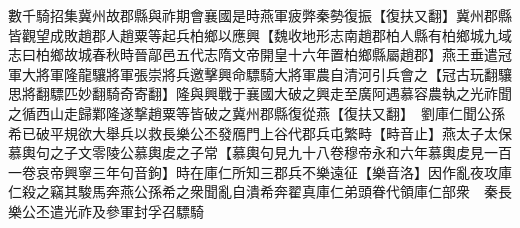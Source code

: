 數千騎招集冀州故郡縣與祚期會襄國是時燕軍疲弊秦勢復振【復扶又翻】冀州郡縣皆觀望成敗趙郡人趙粟等起兵柏鄉以應興【魏收地形志南趙郡柏人縣有柏鄉城九域志曰柏鄉故城春秋時晉鄗邑五代志隋文帝開皇十六年置柏鄉縣屬趙郡】燕王垂遣冠軍大將軍隆龍驤將軍張崇將兵邀擊興命驃騎大將軍農自清河引兵會之【冠古玩翻驤思將翻驃匹妙翻騎奇寄翻】隆與興戰于襄國大破之興走至廣阿遇慕容農執之光祚聞之循西山走歸鄴隆遂撃趙粟等皆破之冀州郡縣復從燕【復扶又翻】　劉庫仁聞公孫希已破平規欲大舉兵以救長樂公丕發鴈門上谷代郡兵屯繁畤【畤音止】燕太子太保慕輿句之子文零陵公慕輿䖍之子常【慕輿句見九十八卷穆帝永和六年慕輿䖍見一百一卷哀帝興寧三年句音鉤】時在庫仁所知三郡兵不樂遠征【樂音洛】因作亂夜攻庫仁殺之竊其駿馬奔燕公孫希之衆聞亂自潰希奔翟真庫仁弟頭眷代領庫仁部衆　秦長樂公丕遣光祚及參軍封孚召驃騎